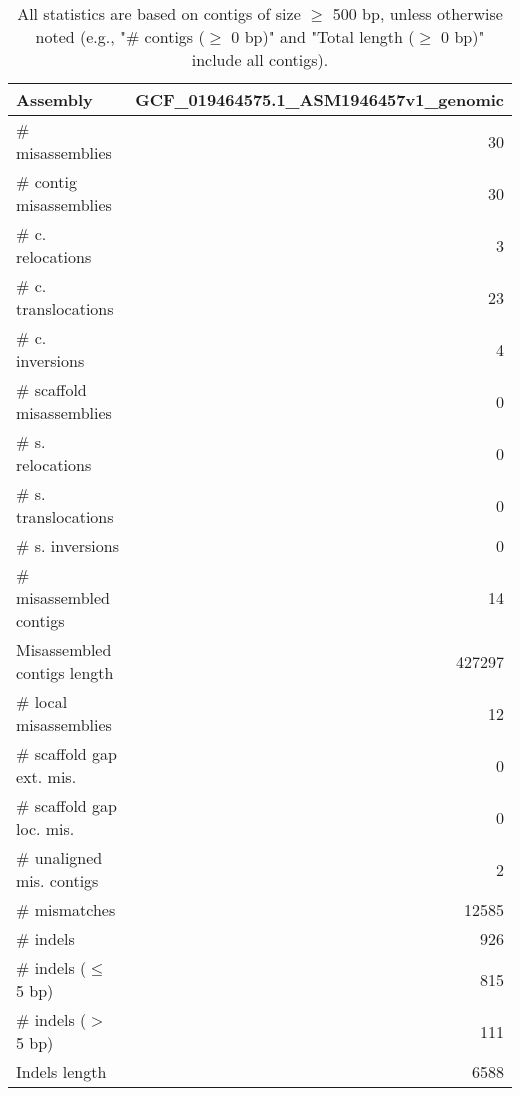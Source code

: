 \documentclass[12pt,a4paper]{article}
\begin{document}
\begin{table}[ht]
\begin{center}
\caption{All statistics are based on contigs of size $\geq$ 500 bp, unless otherwise noted (e.g., "\# contigs ($\geq$ 0 bp)" and "Total length ($\geq$ 0 bp)" include all contigs).}
\begin{tabular}{|l*{1}{|r}|}
\hline
Assembly & GCF\_019464575.1\_ASM1946457v1\_genomic \\ \hline
\# misassemblies & 30 \\ \hline
\hspace{2mm}\# contig misassemblies & 30 \\ \hline
\hspace{5mm}\# c. relocations & 3 \\ \hline
\hspace{5mm}\# c. translocations & 23 \\ \hline
\hspace{5mm}\# c. inversions & 4 \\ \hline
\hspace{2mm}\# scaffold misassemblies & 0 \\ \hline
\hspace{5mm}\# s. relocations & 0 \\ \hline
\hspace{5mm}\# s. translocations & 0 \\ \hline
\hspace{5mm}\# s. inversions & 0 \\ \hline
\# misassembled contigs & 14 \\ \hline
Misassembled contigs length & 427297 \\ \hline
\# local misassemblies & 12 \\ \hline
\# scaffold gap ext. mis. & 0 \\ \hline
\# scaffold gap loc. mis. & 0 \\ \hline
\# unaligned mis. contigs & 2 \\ \hline
\# mismatches & 12585 \\ \hline
\# indels & 926 \\ \hline
\hspace{5mm}\# indels ($\leq$ 5 bp) & 815 \\ \hline
\hspace{5mm}\# indels ($>$ 5 bp) & 111 \\ \hline
Indels length & 6588 \\ \hline
\end{tabular}
\end{center}
\end{table}
\end{document}
